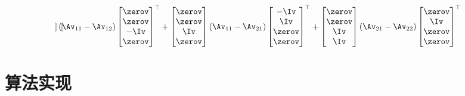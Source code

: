 \documentclass{ctexart}
\begin{document}
\begin{align*}
\begin{bmatrix}
    \end{bmatrix} (\Av_{11} - \Av_{12})
    \begin{bmatrix}
        \zerov \\ \zerov \\ -\Iv \\ \zerov
    \end{bmatrix}^\top +
    \begin{bmatrix}
        \zerov \\ \zerov \\ \Iv \\ \zerov
    \end{bmatrix} (\Av_{11} - \Av_{21})
    \begin{bmatrix}
        -\Iv \\ \Iv \\ \zerov \\ \zerov
    \end{bmatrix}^\top +
    \begin{bmatrix}
        \zerov \\ \zerov \\ \Iv \\ \Iv
    \end{bmatrix} (\Av_{21} - \Av_{22})
    \begin{bmatrix}
        \zerov \\ \Iv \\ \zerov \\ \zerov
    \end{bmatrix}^\top
\end{align*}

\section{算法实现}
\end{document}
